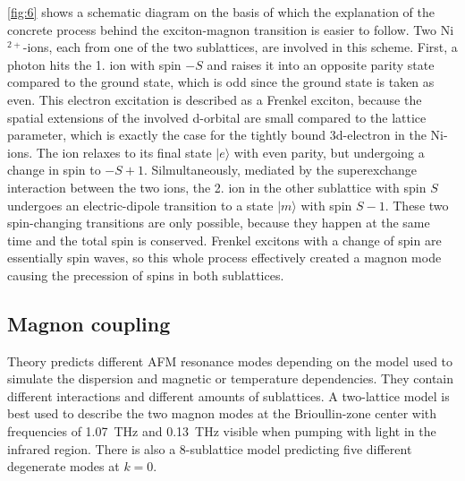 \FloatBarrier
\autoref{fig:6} shows a schematic diagram on the basis of which the explanation of the concrete process behind the exciton-magnon transition is easier to follow.
Two Ni$^{2+}$-ions, each from one of the two sublattices, are involved in this scheme.
First, a photon hits the 1. ion with spin $-S$ and raises it into an opposite parity state compared to the ground state, which is odd since the ground state is taken as even.
This electron excitation is described as a Frenkel exciton, because the spatial extensions of the involved d-orbital are small compared to the lattice parameter, which is exactly the case for the tightly bound 3d-electron in the Ni-ions.
The ion relaxes to its final state $|e\rangle$ with even parity, but undergoing a change in spin to $-S+1$.
Silmultaneously, mediated by the superexchange interaction between the two ions, the 2. ion in the other sublattice with spin $S$ undergoes an electric-dipole transition to a state $|m\rangle$ with spin $S-1$.
These two spin-changing transitions are only possible, because they happen at the same time and the total spin is conserved.
Frenkel excitons with a change of spin are essentially spin waves, so this whole process effectively created a magnon mode causing the precession of spins in both sublattices.

\subsection{Magnon coupling}
\label{sec:mode_coupling}
Theory predicts different AFM resonance modes depending on the model used to simulate the dispersion and magnetic or temperature dependencies.
They contain different interactions and different amounts of sublattices.
A two-lattice model is best used to describe the two magnon modes at the Brioullin-zone center with frequencies of \qty{1.07}{THz} and \qty{0.13}{THz} visible when pumping with light in the infrared region.
There is also a 8-sublattice model predicting five different degenerate modes at $k=0$. 

